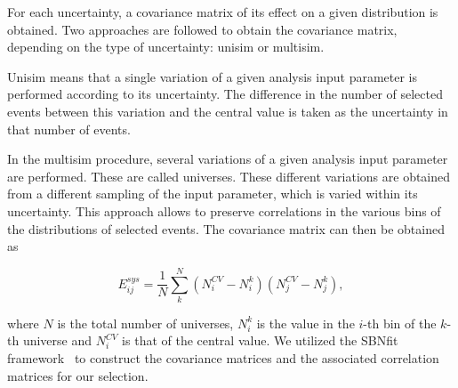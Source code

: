 \documentclass[a4paper]{article}
\begin{document}
For each uncertainty, a covariance matrix of its effect on a given distribution is obtained. Two approaches are followed to obtain the covariance matrix, depending on the type of uncertainty: unisim or multisim.

Unisim means that a single variation of a given analysis input parameter is performed according to its uncertainty. The difference in the number of selected events between this variation and the central value is taken as the uncertainty in that number of events.

In the multisim procedure, several variations of a given analysis input parameter are performed. These are called universes. These different variations are obtained from a different sampling of the input parameter, which is varied within its uncertainty. This approach allows to preserve correlations in the various bins of the distributions of selected events. The covariance matrix can then be obtained as

\begin{equation}
    E_{ij}^{sys} = \frac{1}{N}\sum_{k}^N (N_i^{CV} - N_i^k)(N_j^{CV} - N_j^k) ,
\end{equation}

where $N$ is the total number of universes, $N_i^k$ is the value in the
$i$-th bin of the $k$-th universe and $N_i^{CV}$ is that of the central value. We utilized the SBNfit framework~\cite{bib:bib:sbnfit20437} to construct the covariance matrices and the associated correlation matrices for our selection.
\end{document}
